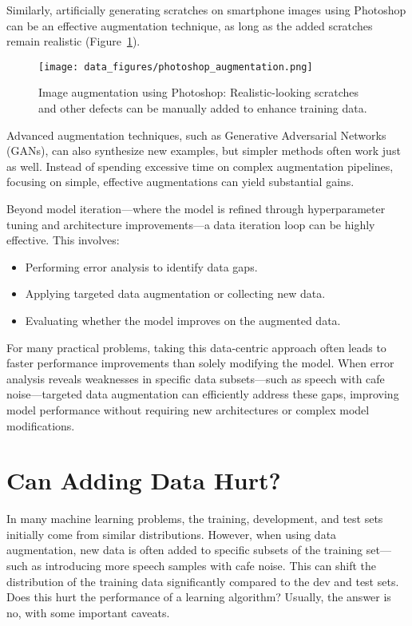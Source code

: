 \documentclass[12pt,openany, draft]{book}
\begin{document}
Similarly, artificially generating scratches on smartphone images using Photoshop can be an effective augmentation technique, as long as the added scratches remain realistic (Figure~\ref{fig:photoshop_augmentation}).

\begin{figure}[H]
    \centering
    \texttt{[image: data\_figures/photoshop\_augmentation.png]}
    \caption{Image augmentation using Photoshop: Realistic-looking scratches and other defects can be manually added to enhance training data.}
    \label{fig:photoshop_augmentation}
\end{figure}

Advanced augmentation techniques, such as Generative Adversarial Networks (GANs), can also synthesize new examples, but simpler methods often work just as well. Instead of spending excessive time on complex augmentation pipelines, focusing on simple, effective augmentations can yield substantial gains.

Beyond model iteration—where the model is refined through hyperparameter tuning and architecture improvements—a data iteration loop can be highly effective. This involves:
\begin{itemize}
    \item Performing error analysis to identify data gaps.
    \item Applying targeted data augmentation or collecting new data.
    \item Evaluating whether the model improves on the augmented data.
\end{itemize}

For many practical problems, taking this data-centric approach often leads to faster performance improvements than solely modifying the model. When error analysis reveals weaknesses in specific data subsets—such as speech with cafe noise—targeted data augmentation can efficiently address these gaps, improving model performance without requiring new architectures or complex model modifications.



\section{Can Adding Data Hurt?}

In many machine learning problems, the training, development, and test sets initially come from similar distributions. However, when using data augmentation, new data is often added to specific subsets of the training set—such as introducing more speech samples with cafe noise. This can shift the distribution of the training data significantly compared to the dev and test sets. Does this hurt the performance of a learning algorithm? Usually, the answer is no, with some important caveats. \newline
\end{document}
